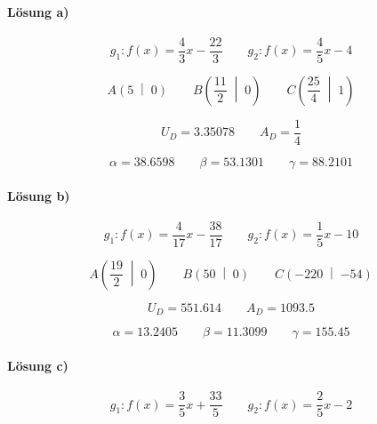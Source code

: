 \paragraph{Lösung a)}
\begin{equation*}
  g_1:f(x)=\frac{\num{4}}{\num{3}}x-\frac{\num{22}}{\num{3}}
  \qquad
  g_2:f(x)=\frac{\num{4}}{\num{5}}x-\num{4}
\end{equation*}

\begin{equation*}
  A\left(\num{5}\;\middle|\;\num{0}\right)
  \qquad
  B\left(\frac{\num{11}}{\num{2}}\;\middle|\;\num{0}\right)
  \qquad
  C\left(\frac{\num{25}}{\num{4}}\;\middle|\;\num{1}\right)
\end{equation*}

\begin{equation*}
  U_D=\num{3.35078}
  \qquad
  A_D=\frac{\num{1}}{\num{4}}
\end{equation*}

\begin{equation*}
  \alpha=\num{38.6598}
  \qquad
  \beta=\num{53.1301}
  \qquad
  \gamma=\num{88.2101}
\end{equation*}

\paragraph{Lösung b)}
\begin{equation*}
  g_1:f(x)=\frac{\num{4}}{\num{17}}x-\frac{\num{38}}{\num{17}}
  \qquad
  g_2:f(x)=\frac{\num{1}}{\num{5}}x-\num{10}
\end{equation*}

\begin{equation*}
  A\left(\frac{\num{19}}{\num{2}}\;\middle|\;\num{0}\right)
  \qquad
  B\left(\num{50}\;\middle|\;\num{0}\right)
  \qquad
  C\left(\num{-220}\;\middle|\;\num{-54}\right)
\end{equation*}

\begin{equation*}
  U_D=\num{551.614}
  \qquad
  A_D=\num{1093.5}
\end{equation*}

\begin{equation*}
  \alpha=\num{13.2405}
  \qquad
  \beta=\num{11.3099}
  \qquad
  \gamma=\num{155.45}
\end{equation*}

\paragraph{Lösung c)}
\begin{equation*}
  g_1:f(x)=\frac{\num{3}}{\num{5}}x+\frac{\num{33}}{\num{5}}
  \qquad
  g_2:f(x)=\frac{\num{2}}{\num{5}}x-\num{2}
\end{equation*}

